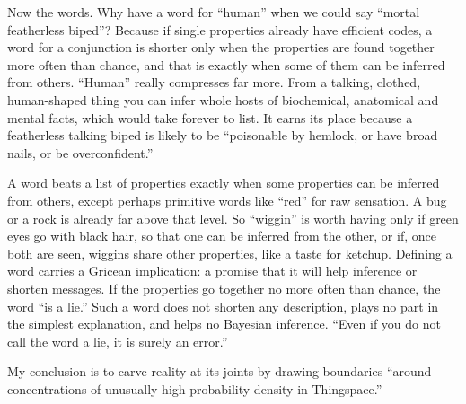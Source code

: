 Now the words. Why have a word for ``human'' when we could say ``mortal featherless biped''? Because if single properties already have efficient codes, a word for a conjunction is shorter only when the properties are found together more often than chance, and that is exactly when some of them can be inferred from others.  ``Human'' really compresses far more. From a talking, clothed, human-shaped thing you can infer whole hosts of biochemical, anatomical and mental facts, which would take forever to list. It earns its place because a featherless talking biped is likely to be ``poisonable by hemlock, or have broad nails, or be overconfident.'' 

A word beats a list of properties exactly when some properties can be inferred from others, except perhaps primitive words like ``red'' for raw sensation. A bug or a rock is already far above that level. So ``wiggin'' is worth having only if green eyes go with black hair, so that one can be inferred from the other, or if, once both are seen, wiggins share other properties, like a taste for ketchup. Defining a word carries a Gricean implication: a promise that it will help inference or shorten messages. If the properties go together no more often than chance, the word ``is a lie.'' Such a word does not shorten any description, plays no part in the simplest explanation, and helps no Bayesian inference. ``Even if you do not call the word a lie, it is surely an error.''

My conclusion is to carve reality at its joints by drawing boundaries ``around concentrations of unusually high probability density in Thingspace.'' 

